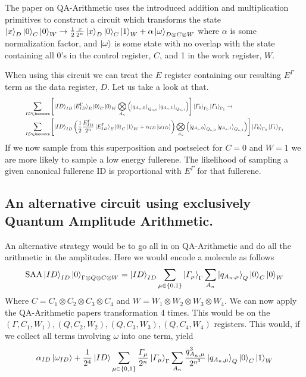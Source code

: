 \documentclass{article}
\begin{document}
\vspace{\baselineskip}
The paper on QA-Arithmetic uses the introduced addition and multiplication primitives to construct a circuit which transforms the state $\ket{x}_D\ket{0}_C\ket{0}_W \to \frac{1}{2}\frac{x}{2^n}\ket{x}_D\ket{0}_C\ket{1}_W+\alpha\ket{\omega}_{D \otimes C\otimes W}$ where $\alpha$ is some normalization factor, and $\ket{\omega}$ is some state with no overlap with the state containing all 0's in the control register, $C$, and 1 in the work register, $W$.


\vspace{\baselineskip}
When using this circuit we can treat the $E$ register containing our resulting $E^\Gamma$ term as the data register, $D$. Let us take a look at that.
\begin{equation}
   \resizebox{.9\hsize}{!}{$\begin{split}
       \sum_{ID\in \text{isomers}}&\left [ \ket{ID}_{ID}\ket{E^\Gamma_{ID}}_E\ket{0}_C\ket{0}_W\bigotimes_{A_n}\left ( \ket{q_{A_n,0}}_{Q_{n,0}}\ket{q_{A_n,1}}_{Q_{n,1}}\right ) \right ] \ket{\varGamma_0}_{\Gamma_0}\ket{\varGamma_1}_{\Gamma_1} \to\\ 
        \sum_{ID\in \text{isomers}}&\left [ \ket{ID}_{ID}\left(\frac{1}{2}\frac{E^\Gamma_{ID}}{2^n}\ket{E^\Gamma_{ID}}_E\ket{0}_C\ket{1}_W+\alpha_{ID}\ket{\omega_{ID}}\right)\bigotimes_{A_n}\left ( \ket{q_{A_n,0}}_{Q_{n,0}}\ket{q_{A_n,1}}_{Q_{n,1}}\right ) \right ] \ket{\varGamma_0}_{\Gamma_0}\ket{\varGamma_1}_{\Gamma_1}\\ 
   \end{split}$}
\end{equation}
If we now sample from this superposition and postselect for $C = 0$ and $W = 1$ we are more likely to sample a low energy fullerene. The likelihood of sampling a given canonical fullerene ID is proportional with $E^\Gamma$ for that fullerene.

\subsection{An alternative circuit using exclusively Quantum Amplitude Arithmetic.}
An alternative strategy would be to go all in on QA-Arithmetic and do all the arithmetic in the amplitudes. 
Here we would encode a molecule as follows
\begin{equation}
    \text{SAA}\ket{ID}_{ID}\ket{0}_{\Gamma\otimes Q\otimes C\otimes W}=\ket{ID}_{ID}\sum_{\mu\in\{0,1\}}\ket{\varGamma_\mu}_\Gamma\sum_{A_n}\ket{q_{A_n,\mu}}_Q\ket{0}_{C}\ket{0}_{W}
\end{equation}
Where $C = C_1\otimes C_2\otimes C_3\otimes C_4$ and $W = W_1\otimes W_2\otimes W_3\otimes W_4$.
We can now apply the QA-Arithmetic papers transformation 4 times. This would be on the $(\Gamma,C_1,W_1), (Q,C_2,W_2), (Q,C_3,W_3), (Q,C_4,W_4)$ registers.
This would, if we collect all terms involving $\omega$ into one term, yield
\begin{equation}
    \alpha_{ID}\ket{\omega_{ID}}+\frac{1}{2^4}\ket{ID}\sum_{\mu\in\{0,1\}}\frac{\varGamma_\mu}{2^{n}}\ket{\varGamma_\mu}_\Gamma\sum_{A_n}\frac{q_{A_n,\mu}^3}{2^{n^3}}\ket{q_{A_n,\mu}}_Q\ket{0}_{C}\ket{1}_{W}
\end{equation}
\end{document}

